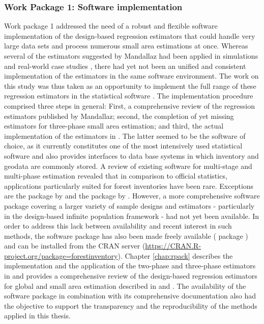 \subsubsection{Work Package 1: Software implementation} %


Work package 1 addressed the need of a robust and flexible software implementation of the design-based regression estimators that could handle very large data sets and process numerous small area estimations at once. Whereas several of the estimators suggested by Mandallaz had been applied in simulations and real-world case studies \citep{mandallaz2013a, mandallaz2013b, mandallaz2013c, massey2014a, massey2015a, massey2015b}, there had yet not been an unified and consistent implementation of the estimators in the same software environment. The work on this study was thus taken as an opportunity to implement the full range of these regression estimators in the statistical software  \citep{R}. The implementation procedure comprised three steps in general: First, a comprehensive review of the regression estimators published by Mandallaz; second, the completion of yet missing estimators for three-phase small area estimation; and third, the actual implementation of the estimators in . The latter seemed to be the software of choice, as it currently constitutes one of the most intensively used statistical software and also provides interfaces to data base systems in which inventory and geodata are commonly stored. A review of existing software for multi-stage and multi-phase estimation revealed that in comparison to official statistics, applications particularly suited for forest inventories have been rare. Exceptions are the  package  by \citet{josae2015} and the  package by \citet{cullmann2016}. However, a more comprehensive software package covering a larger variety of sample designs and estimators - particularly in the design-based infinite population framework - had not yet been available. In order to address this lack between availability and recent interest in such methods, the software package has also been made freely available ( package ) and can be installed from the CRAN server (\url{https://CRAN.R-project.org/package=forestinventory}). Chapter \ref{chap:rpack} describes the implementation and the application of the two-phase and three-phase estimators in  and provides a comprehensive review of the design-based regression estimators for global and small area estimation described in \citet{mandallaz2008, mandallaz2013a, mandallaz2013c} and \citet{mandallaz2013b}. The availability of the software package in combination with its comprehensive documentation also had the objective to support the transparency and the reproducibility of the methods applied in this thesis.


